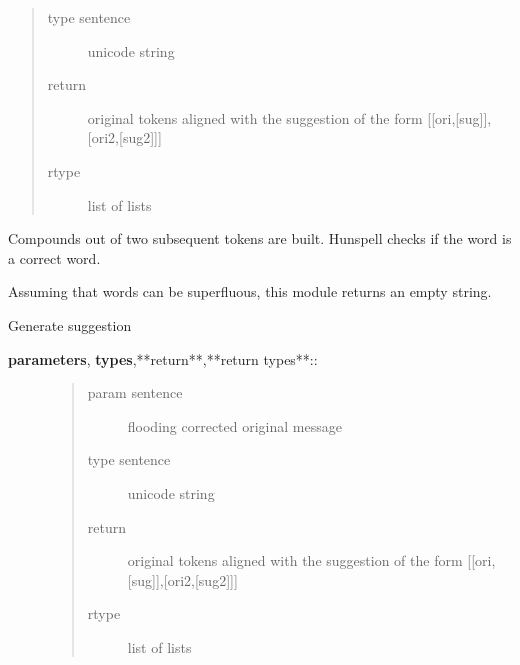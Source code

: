 \documentclass[letterpaper,10pt,english]{sphinxmanual}
\begin{document}
\begin{fulllineitems}
\begin{fulllineitems}
\begin{description}
\begin{quote}
\begin{description}
\item[{type sentence}] \leavevmode
unicode string

\item[{return}] \leavevmode
original tokens aligned with the suggestion of the form {[}{[}ori,{[}sug{]}{]},{[}ori2,{[}sug2{]}{]}{]}

\item[{rtype}] \leavevmode
list of lists

\end{description}\end{quote}

\end{description}

Compounds out of two subsequent tokens are built. Hunspell checks if the word is a correct word.

\end{fulllineitems}


\end{fulllineitems}

\label{API:module-norm.modules.empty}

\begin{fulllineitems}
\label{API:norm.modules.empty.Empty}
Assuming that words can be superfluous, this module returns an empty string.

\begin{fulllineitems}
\label{API:norm.modules.empty.Empty.generate_alternatives}
Generate suggestion
\begin{description}
\item[{\textbf{parameters}, \textbf{types},**return**,**return types**::}] \leavevmode\begin{quote}\begin{description}
\item[{param sentence}] \leavevmode
flooding corrected original message

\item[{type sentence}] \leavevmode
unicode string

\item[{return}] \leavevmode
original tokens aligned with the suggestion of the form {[}{[}ori,{[}sug{]}{]},{[}ori2,{[}sug2{]}{]}{]}

\item[{rtype}] \leavevmode
list of lists

\end{description}\end{quote}

\end{description}

\end{fulllineitems}


\end{fulllineitems}
\end{document}
